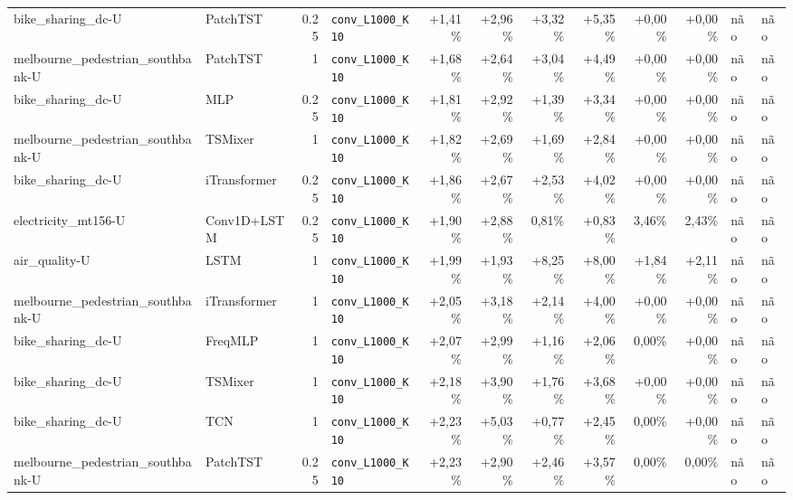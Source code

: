 \begin{longtable}{llrlrrrrrrll}
bike\_sharing\_dc-U & PatchTST & 0.25 & \texttt{conv\_\allowbreak{}L1000\_\allowbreak{}K10} & +1,41\% & +2,96\% & +3,32\% & +5,35\% & +0,00\% & +0,00\% & n\~ao & n\~ao \\
melbourne\_pedestrian\_southbank-U & PatchTST & 1 & \texttt{conv\_\allowbreak{}L1000\_\allowbreak{}K10} & +1,68\% & +2,64\% & +3,04\% & +4,49\% & +0,00\% & +0,00\% & n\~ao & n\~ao \\
bike\_sharing\_dc-U & MLP & 0.25 & \texttt{conv\_\allowbreak{}L1000\_\allowbreak{}K10} & +1,81\% & +2,92\% & +1,39\% & +3,34\% & +0,00\% & +0,00\% & n\~ao & n\~ao \\
melbourne\_pedestrian\_southbank-U & TSMixer & 1 & \texttt{conv\_\allowbreak{}L1000\_\allowbreak{}K10} & +1,82\% & +2,69\% & +1,69\% & +2,84\% & +0,00\% & +0,00\% & n\~ao & n\~ao \\
bike\_sharing\_dc-U & iTransformer & 0.25 & \texttt{conv\_\allowbreak{}L1000\_\allowbreak{}K10} & +1,86\% & +2,67\% & +2,53\% & +4,02\% & +0,00\% & +0,00\% & n\~ao & n\~ao \\
electricity\_mt156-U & Conv1D+LSTM & 0.25 & \texttt{conv\_\allowbreak{}L1000\_\allowbreak{}K10} & +1,90\% & +2,88\% & \textminus{}0,81\% & +0,83\% & \textminus{}3,46\% & \textminus{}2,43\% & n\~ao & n\~ao \\
air\_quality-U & LSTM & 1 & \texttt{conv\_\allowbreak{}L1000\_\allowbreak{}K10} & +1,99\% & +1,93\% & +8,25\% & +8,00\% & +1,84\% & +2,11\% & n\~ao & n\~ao \\
melbourne\_pedestrian\_southbank-U & iTransformer & 1 & \texttt{conv\_\allowbreak{}L1000\_\allowbreak{}K10} & +2,05\% & +3,18\% & +2,14\% & +4,00\% & +0,00\% & +0,00\% & n\~ao & n\~ao \\
bike\_sharing\_dc-U & FreqMLP & 1 & \texttt{conv\_\allowbreak{}L1000\_\allowbreak{}K10} & +2,07\% & +2,99\% & +1,16\% & +2,06\% & \textminus{}0,00\% & +0,00\% & n\~ao & n\~ao \\
bike\_sharing\_dc-U & TSMixer & 1 & \texttt{conv\_\allowbreak{}L1000\_\allowbreak{}K10} & +2,18\% & +3,90\% & +1,76\% & +3,68\% & +0,00\% & +0,00\% & n\~ao & n\~ao \\
bike\_sharing\_dc-U & TCN & 1 & \texttt{conv\_\allowbreak{}L1000\_\allowbreak{}K10} & +2,23\% & +5,03\% & +0,77\% & +2,45\% & \textminus{}0,00\% & +0,00\% & n\~ao & n\~ao \\
melbourne\_pedestrian\_southbank-U & PatchTST & 0.25 & \texttt{conv\_\allowbreak{}L1000\_\allowbreak{}K10} & +2,23\% & +2,90\% & +2,46\% & +3,57\% & \textminus{}0,00\% & \textminus{}0,00\% & n\~ao & n\~ao \\

\end{longtable}

